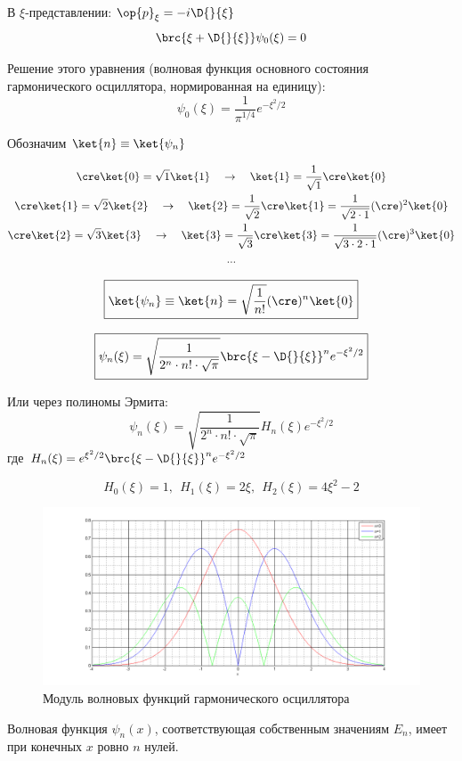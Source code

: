 В $\xi$-представлении: $\op{p}_\xi = -i \D{}{\xi}$
$$
\brc{\xi + \D{}{\xi}} \psi_0(\xi) = 0
$$

Решение этого уравнения (волновая функция основного состояния гармонического осциллятора, нормированная на единицу):
$$
\boxed {
	\psi_0(\xi) = \frac{1}{\pi^{1/4}} e^{-\xi^2/2}
}
$$

\noindent
Обозначим $\ket{n} \equiv \ket{\psi_n}$

$$
\begin{gathered}
\cre \ket{0} = \sqrt{1} \ket{1} ~~~\to~~~ \ket{1} = \frac{1}{\sqrt{1}} \cre \ket{0} \\
\cre \ket{1} = \sqrt{2} \ket{2} ~~~\to~~~ \ket{2} = \frac{1}{\sqrt{2}} \cre \ket{1} = \frac{1}{\sqrt{2 \cdot 1}} (\cre)^2 \ket{0} \\
\cre \ket{2} = \sqrt{3} \ket{3} ~~~\to~~~ \ket{3} = \frac{1}{\sqrt{3}} \cre \ket{3} = \frac{1}{\sqrt{3 \cdot 2 \cdot 1}} (\cre)^3 \ket{0} \\
...
\end{gathered}
$$

$$
\boxed {
	\ket{\psi_n} \equiv \ket{n} = \sqrt{\frac{1}{n!}}(\cre)^n \ket{0}
}
$$

$$
\boxed {
	\psi_n(\xi) = \sqrt{\frac{1}{2^n \cdot n! \cdot \sqrt{\pi}}} \brc{\xi - \D{}{\xi}}^n e^{-\xi^2/2}
}
$$

Или через полиномы Эрмита:
$$
\boxed {
	\psi_n(\xi) = \sqrt{\frac{1}{2^n \cdot n! \cdot \sqrt{\pi}}} H_n(\xi) e^{-\xi^2/2}
}
$$
где $H_n(\xi) = e^{\xi^2/2} \brc{\xi - \D{}{\xi}}^n e^{-\xi^2/2} $

$$
H_0(\xi) = 1,~~ H_1(\xi) = 2\xi,~~ H_2(\xi) = 4\xi^2 - 2
$$
\begin{figure}[h]
  \centering
  \includegraphics[scale=0.3]{figs/7_2}
  \caption{Модуль волновых функций гармонического осциллятора}
  \label{fig:7_2}
\end{figure}

\begin{thm}
Волновая функция $\psi_n(x)$, соответствующая собственным значениям $E_n$, имеет при конечных $x$ ровно $n$ нулей.
\end{thm}

